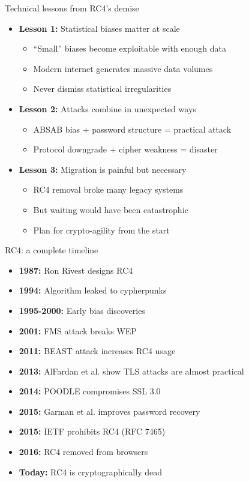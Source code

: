 \documentclass[aspectratio=169, lualatex, handout]{beamer}
\begin{document}
\begin{frame}{Technical lessons from RC4's demise}
	\begin{itemize}
		\item \textbf{Lesson 1:} Statistical biases matter at scale
		      \begin{itemize}
			      \item ``Small'' biases become exploitable with enough data
			      \item Modern internet generates massive data volumes
			      \item Never dismiss statistical irregularities
		      \end{itemize}
		\item \textbf{Lesson 2:} Attacks combine in unexpected ways
		      \begin{itemize}
			      \item ABSAB bias + password structure = practical attack
			      \item Protocol downgrade + cipher weakness = disaster
		      \end{itemize}
		\item \textbf{Lesson 3:} Migration is painful but necessary
		      \begin{itemize}
			      \item RC4 removal broke many legacy systems
			      \item But waiting would have been catastrophic
			      \item Plan for crypto-agility from the start
		      \end{itemize}
	\end{itemize}
\end{frame}

\begin{frame}{RC4: a complete timeline}
	\begin{itemize}
		\item \textbf{1987:} Ron Rivest designs RC4
		\item \textbf{1994:} Algorithm leaked to cypherpunks
		\item \textbf{1995-2000:} Early bias discoveries
		\item \textbf{2001:} FMS attack breaks WEP
		\item \textbf{2011:} BEAST attack increases RC4 usage
		\item \textbf{2013:} AlFardan et al. show TLS attacks are almost practical
		\item \textbf{2014:} POODLE compromises SSL 3.0
		\item \textbf{2015:} Garman et al. improves password recovery
		\item \textbf{2015:} IETF prohibits RC4 (RFC 7465)
		\item \textbf{2016:} RC4 removed from browsers
		\item \textbf{Today:} RC4 is cryptographically dead
	\end{itemize}
\end{frame}
\end{document}
